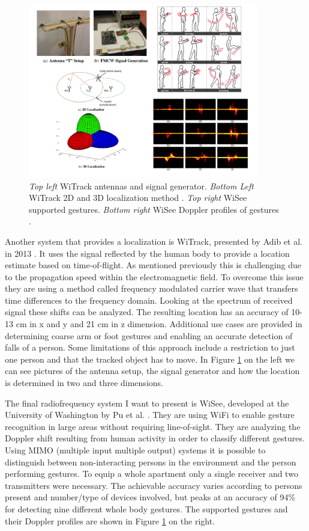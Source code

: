 \begin{figure}[h]
\centering
\includegraphics[width=0.9\textwidth]{images/tech_mic2}
\caption{\emph{Top left} WiTrack antennas and signal generator. \emph{Bottom Left} WiTrack 2D and 3D localization method \cite{adib20133d}. \emph{Top right} WiSee supported gestures. \emph{Bottom right} WiSee Doppler profiles of gestures \cite{pu2013whole}.}
\label{fig:tech_mic2}
\end{figure}

Another system that provides a localization is WiTrack, presented by Adib et al. in 2013 \cite{adib20133d}. It uses the signal reflected by the human body to provide a location estimate based on time-of-flight. As mentioned previously this is challenging due to the propagation speed within the electromagnetic field. To overcome this issue they are using a method called frequency modulated carrier wave that transfers time differences to the frequency domain. Looking at the spectrum of received signal these shifts can be analyzed. The resulting location has an accuracy of 10-13 cm in x and y and 21 cm in z dimension. Additional use cases are provided in determining coarse arm or foot gestures and enabling an accurate detection of falls of a person. Some limitations of this approach include a restriction to just one person and that the tracked object has to move. In Figure \ref{fig:tech_mic2} on the left we can see pictures of the antenna setup, the signal generator and how the location is determined in two and three dimensions.

The final radiofrequency system I want to present is WiSee, developed at the University of Washington by Pu et al. \cite{pu2013whole}. They are using WiFi to enable gesture recognition in large areas without requiring line-of-sight. They are analyzing the Doppler shift resulting from human activity in order to classify different gestures. Using MIMO (multiple input multiple output) systems it is possible to distinguish between non-interacting persons in the environment and the person performing gestures. To equip a whole apartment only a single receiver and two transmitters were necessary. The achievable accuracy varies according to persons present and number/type of devices involved, but peaks at an accuracy of 94\% for detecting nine different whole body gestures. The supported gestures and their Doppler profiles are shown in Figure \ref{fig:tech_mic2} on the right.